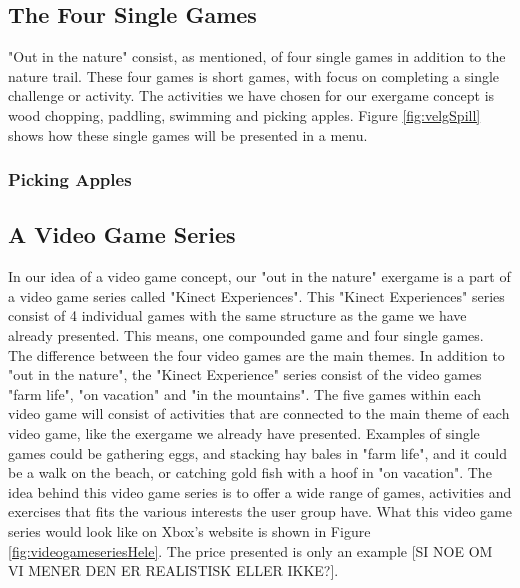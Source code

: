 \subsection{The Four Single Games}
"Out in the nature" consist, as mentioned, of four single games in addition to the nature trail. These four games is short games, with focus on completing a single challenge or activity. The activities we have chosen for our exergame concept is wood chopping, paddling, swimming and picking apples. Figure \ref{fig:velgSpill} shows how these single games will be presented in a menu. 


\subsubsection{Picking Apples}

\subsection{A Video Game Series}
In our idea of a video game concept, our "out in the nature" exergame is a part of a video game series called "Kinect Experiences". This "Kinect Experiences" series consist of 4 individual games with the same structure as the game we have already presented. This means, one compounded game and four single games. The difference between the four video games are the main themes. In addition to "out in the nature", the "Kinect Experience" series consist of the video games "farm life", "on vacation" and "in the mountains". The five games within each video game will consist of activities that are connected to the main theme of each video game, like the exergame we already have presented. Examples of single games could be gathering eggs, and stacking hay bales in "farm life", and it could be a walk on the beach, or catching gold fish with a hoof in "on vacation". The idea behind this video game series is to offer a wide range of games, activities and exercises that fits the various interests the user group have. What this video game series would look like on Xbox's website is shown in Figure \ref{fig:videogameseriesHele}. The price presented is only an example [SI NOE OM VI MENER DEN ER REALISTISK ELLER IKKE?].  

